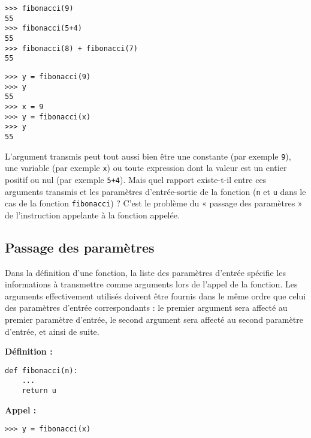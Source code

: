 \noindent\mbox{}\hspace*{1cm}\begin{py}{6cm}
\begin{verbatim}
>>> fibonacci(9)
55
>>> fibonacci(5+4)
55
>>> fibonacci(8) + fibonacci(7)
55
\end{verbatim}
\end{py}\hfill
\begin{py}{6cm}
\begin{verbatim}
>>> y = fibonacci(9)
>>> y
55
>>> x = 9
>>> y = fibonacci(x)
>>> y
55
\end{verbatim}
\end{py}
\hspace*{1cm}\mbox{}\vspace*{2mm}

\noindent L'argument transmis peut tout aussi bien être une constante (par exemple {\tt 9}),
une variable (par exemple {\tt x}) ou toute expression dont la valeur est un entier positif ou
nul (par exemple {\tt 5+4}). Mais quel rapport existe-t-il entre ces arguments transmis
et les paramètres d'entrée-sortie de la fonction ({\tt n} et {\tt u} dans le cas de la fonction
{\tt fibonacci}) ? C'est le problème du « passage des paramètres » de l'instruction appelante
à la fonction appelée.

\subsection{Passage des paramètres}\label{sub:passage}
Dans la définition d'une fonction, la liste des paramètres d'entrée 
spécifie les informations à transmettre comme arguments lors de l'appel de la
fonction. Les arguments effectivement utilisés doivent être fournis dans le même 
ordre que celui des paramètres d'entrée correspondants : 
le premier argument sera affecté au premier paramètre d'entrée, 
le second argument sera affecté au second paramètre d'entrée, et ainsi de suite.

\noindent\mbox{}\hspace*{1cm}\begin{py}{6cm}
\bf Définition :
\begin{verbatim}
def fibonacci(n):
    ...
    return u
\end{verbatim}
\end{py}\hfill
\begin{py}{6cm}
\bf Appel :
\begin{verbatim}
>>> y = fibonacci(x)
\end{verbatim}
\end{py}
\hspace*{1cm}\mbox{}\vspace*{2mm}

